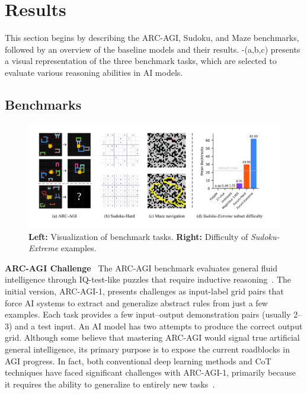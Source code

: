 \section{Results}

This section begins by describing the ARC-AGI, Sudoku, and Maze benchmarks, followed by an overview of the baseline models and their results. -(a,b,c) presents a visual representation of the three benchmark tasks, which are selected to evaluate various reasoning abilities in AI models.

\subsection{Benchmarks}

\begin{figure}[t]
    \centering
    \includegraphics[width=1\linewidth]{figures/benchmark_bars/dataset_intro.pdf}
    \caption{\textbf{Left:} Visualization of benchmark tasks. \textbf{Right:} Difficulty of \textit{Sudoku-Extreme} examples.}
    \label{fig:benchmark_intro}
\end{figure}


\textbf{ARC-AGI Challenge}~ The ARC-AGI benchmark evaluates general fluid intelligence through IQ-test-like puzzles that require inductive reasoning~\cite{AbstractionReasoning2019}. The initial version, ARC-AGI-1, presents challenges as input-label grid pairs that force AI systems to extract and generalize abstract rules from just a few examples. Each task provides a few input–output demonstration pairs (usually 2–3) and a test input. An AI model has two attempts to produce the correct output grid. Although some believe that mastering ARC-AGI would signal true artificial general intelligence, its primary purpose is to expose the current roadblocks in AGI progress. In fact, both conventional deep learning methods and CoT techniques have faced significant challenges with ARC-AGI-1, primarily because it requires the ability to generalize to entirely new tasks~\citep{Chollet2024ARCP2}.

